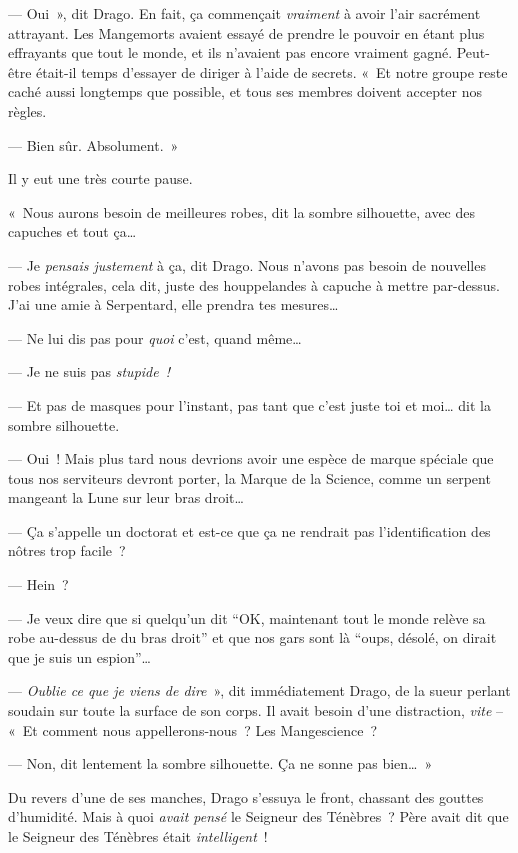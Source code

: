 --- Oui~», dit Drago.
En fait, ça commençait \emph{vraiment} à avoir l'air sacrément attrayant.
Les Mangemorts avaient essayé de prendre le pouvoir en étant plus effrayants que tout le monde, et ils n'avaient pas encore vraiment gagné.
Peut-être était-il temps d'essayer de diriger à l'aide de secrets.
«~Et notre groupe reste caché aussi longtemps que possible, et tous ses membres doivent accepter nos règles.

--- Bien sûr.
Absolument.~»

Il y eut une très courte pause.

«~Nous aurons besoin de meilleures robes, dit la sombre silhouette, avec des capuches et tout ça…

--- Je \emph{pensais justement} à ça, dit Drago.
Nous n'avons pas besoin de nouvelles robes intégrales, cela dit, juste des houppelandes à capuche à mettre par-dessus.
J'ai une amie à Serpentard, elle prendra tes mesures…

--- Ne lui dis pas pour \emph{quoi} c'est, quand même…

--- Je ne suis pas \emph{stupide~!}

--- Et pas de masques pour l'instant, pas tant que c'est juste toi et moi… dit la sombre silhouette.

--- Oui~!
Mais plus tard nous devrions avoir une espèce de marque spéciale que tous nos serviteurs devront porter, la Marque de la Science, comme un serpent mangeant la Lune sur leur bras droit…

--- Ça s'appelle un doctorat et est-ce que ça ne rendrait pas l'identification des nôtres trop facile~?

--- Hein~?

--- Je veux dire que si quelqu'un dit “OK, maintenant tout le monde relève sa robe au-dessus de du bras droit” et que nos gars sont là “oups, désolé, on dirait que je suis un espion”…

--- \emph{Oublie ce que je viens de dire}~», dit immédiatement Drago, de la sueur perlant soudain sur toute la surface de son corps.
Il avait besoin d'une distraction, \emph{vite} -- «~Et comment nous appellerons-nous~?
Les Mangescience~?

--- Non, dit lentement la sombre silhouette.
Ça ne sonne pas bien…~»

Du revers d'une de ses manches, Drago s'essuya le front, chassant des gouttes d'humidité.
Mais à quoi \emph{avait pensé} le Seigneur des Ténèbres~?
Père avait dit que le Seigneur des Ténèbres était \emph{intelligent}~!

